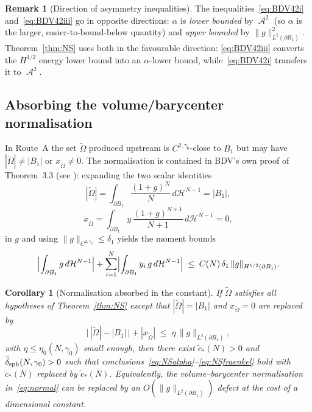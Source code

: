 \documentclass[11pt]{article}
\newtheorem{corollary}[theorem]{Corollary}
\theoremstyle{definition}
\newtheorem{remark}[theorem]{Remark}
\DeclareMathOperator{\Asym}{\mathcal{A}}
\newcommand{\bdy}{\partial}
\newcommand{\Ot}{\widetilde{\Omega}}
\newcommand{\HN}{\mathcal{H}^{N-1}}
\begin{document}
\begin{remark}[Direction of asymmetry inequalities]
The inequalities~\eqref{eq:BDV42i} and~\eqref{eq:BDV42iii} go in opposite
directions: $\alpha$ is \emph{lower bounded} by $\Asym^{2}$ (so $\alpha$
is the larger, easier-to-bound-below quantity) and \emph{upper bounded}
by $\|g\|_{L^2(\bdy B_1)}^2$. Theorem~\ref{thm:NS} uses both in the
favourable direction: \eqref{eq:BDV42iii} converts the $H^{1/2}$ energy
lower bound into an $\alpha$-lower bound, while~\eqref{eq:BDV42i}
transfers it to $\Asym^{2}$.
\end{remark}

\subsection{Absorbing the volume/barycenter normalisation}

In Route~A the set $\Ot$ produced upstream is $C^{2,\gamma_0}$-close to
$B_1$ but may have $|\Ot|\neq|B_1|$ or $x_{\Ot}\neq 0$. The normalisation
is contained in BDV's own proof of Theorem~3.3 (see
\cite[(3.6)--(3.7)]{BDV2013}): expanding the two scalar identities
\begin{equation}\label{eq:vol}
|\Ot|=\int_{\bdy B_1}\frac{(1+g)^N}{N}\,d\HN=|B_1|,
\end{equation}
\begin{equation}\label{eq:bary}
x_{\Ot}=\int_{\bdy B_1}y\,\frac{(1+g)^{N+1}}{N+1}\,d\HN=0,
\end{equation}
in $g$ and using $\|g\|_{C^{2,\gamma_0}}\le\delta_1$ yields the moment
bounds \cite[(3.6)--(3.7)]{BDV2013}
\begin{equation}\label{eq:moment}
\Bigl|\int_{\bdy B_1}g\,d\HN\Bigr|
+\sum_{i=1}^{N}\Bigl|\int_{\bdy B_1}y_i\,g\,d\HN\Bigr|
\;\le\;C(N)\,\delta_1\,\|g\|_{H^{1/2}(\bdy B_1)}.
\end{equation}

\begin{corollary}[Normalisation absorbed in the constant]
\label{cor:normabs}
If $\Ot$ satisfies all hypotheses of Theorem~\ref{thm:NS} except that
$|\Ot|=|B_1|$ and $x_{\Ot}=0$ are replaced by
\[
\bigl|\,|\Ot|-|B_1|\,\bigr|+|x_{\Ot}|
\;\le\;\eta\,\|g\|_{L^2(\bdy B_1)},
\]
with $\eta\le\eta_0(N,\gamma_0)$ small enough, then there exist
$\widetilde{c}_*(N)>0$ and $\widetilde{\delta}_{\rm sph}(N,\gamma_0)>0$
such that conclusions~\eqref{eq:NSalpha}--\eqref{eq:NSfraenkel} hold with
$c_*(N)$ replaced by $\widetilde{c}_*(N)$. Equivalently, the
volume--barycenter normalisation in~\eqref{eq:normal} can be replaced by
an $O(\|g\|_{L^2(\bdy B_1)})$ defect at the cost of a dimensional
constant.
\end{corollary}
\end{document}
